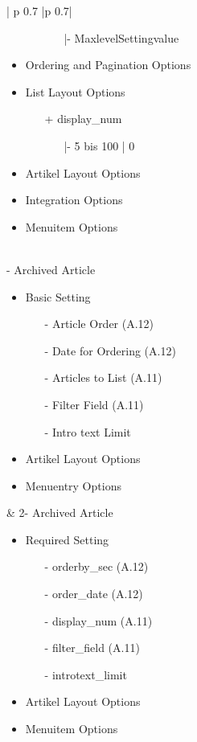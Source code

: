 \begin{minipage}{0.7\textwidth}
\begin{longtable}{| p {0.7\textwidth} |p {0.7\textwidth}|}
\begin{itemize}
\begin{enumerate}
   	   	   			         \begin{enumerate}
   	   	   			          \item[|-] MaxlevelSettingvalue
   	   	   			         \end{enumerate}
   	   	   	   		\end{enumerate}
   	   	\item Ordering and Pagination Options
   	   	\item List Layout Options
   	   	\begin{enumerate}
   	   	\item[+] display\_num
   	   	\begin{enumerate}
   	   				\item[|-] 5 bis 100 | 0
   	   			\end{enumerate}
   	   	\end{enumerate}
   	   	\item Artikel Layout Options
   	   	\item Integration Options
   	   	\item Menuitem Options  
     \end{itemize}   
 	\\ - Archived Article
\begin{itemize}
 \item Basic  Setting 
   		\begin{enumerate}
   		\item[-] Article Order (A.12) 
   		\item[-] Date for Ordering (A.12) 
   		\item[-] Articles to List (A.11)
   		\item[-] Filter Field (A.11) 
   		\item[-] Intro text Limit
   		\end{enumerate}
 	\item Artikel Layout Options
	\item Menuentry Options
\end{itemize}
&
2- Archived Article
\begin{itemize}
	\item Required  Setting 
   		\begin{enumerate}
   		\item[-] orderby\_sec (A.12)
   		\item[-] order\_date (A.12)
   		\item[-] display\_num (A.11) 
   		\item[-] filter\_field (A.11) 
   		\item[-] introtext\_limit 
   		\end{enumerate}
 	\item Artikel Layout Options
	\item Menuitem Options
\end{itemize}
\\ \hline
\end{longtable}
\end{minipage}

